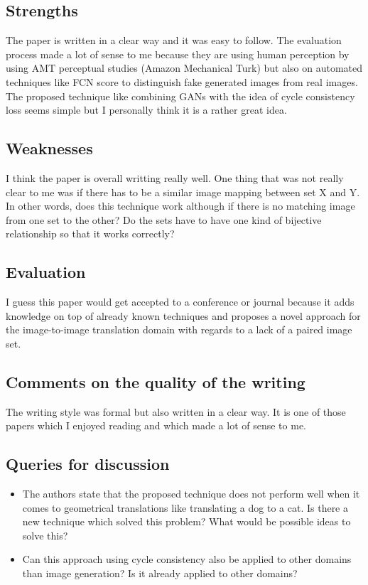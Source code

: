 \documentclass[a4paper]{article}
\begin{document}
\subsection{Strengths}

The paper is written in a clear way and it was easy to follow. The evaluation process made a lot of sense to me because they are using human perception by using AMT perceptual studies (Amazon Mechanical Turk) but also on automated techniques like FCN score to distinguish fake generated images from real images. The proposed technique like combining GANs with the idea of cycle consistency loss seems simple but I personally think it is a rather great idea.

\subsection{Weaknesses}

I think the paper is overall writting really well. One thing that was not really clear to me was if there has to be a similar image mapping between set X and Y. In other words, does this technique work although if there is no matching image from one set to the other? Do the sets have to have one kind of bijective relationship so that it works correctly?

\subsection{Evaluation}

I guess this paper would get accepted to a conference or journal because it adds knowledge on top of already known techniques and proposes a novel approach for the image-to-image translation domain with regards to a lack of a paired image set.

\subsection{Comments on the quality of the writing}

The writing style was formal but also written in a clear way. It is one of those papers which I enjoyed reading and which made a lot of sense to me.

\subsection{Queries for discussion}

\begin{itemize}
	\item The authors state that the proposed technique does not perform well when it comes to geometrical translations like translating a dog to a cat. Is there a new technique which solved this problem? What would be possible ideas to solve this?
	\item Can this approach using cycle consistency also be applied to other domains than image generation? Is it already applied to other domains?
\end{itemize}
\end{document}
